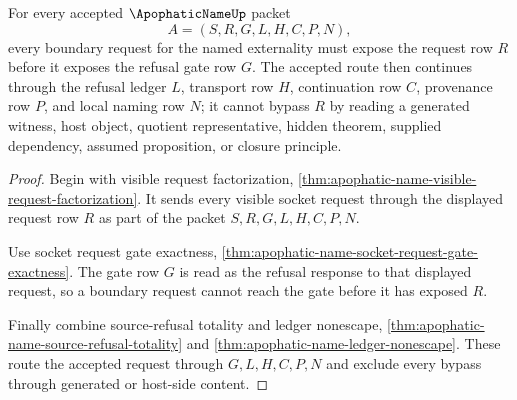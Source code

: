 \begin{theorem}
\label{thm:apophatic-name-boundary-request-totality}
For every accepted $\ApophaticNameUp$ packet
$$
A=(S,R,G,L,H,C,P,N),
$$
every boundary request for the named externality must expose the request row $R$ before it exposes the refusal gate row $G$. The accepted route then continues through the refusal ledger $L$, transport row $H$, continuation row $C$, provenance row $P$, and local naming row $N$; it cannot bypass $R$ by reading a generated witness, host object, quotient representative, hidden theorem, supplied dependency, assumed proposition, or closure principle.
\end{theorem}
\begin{proof}
Begin with visible request factorization, \autoref{thm:apophatic-name-visible-request-factorization}. It sends every visible socket request through the displayed request row $R$ as part of the packet $S,R,G,L,H,C,P,N$.

Use socket request gate exactness, \autoref{thm:apophatic-name-socket-request-gate-exactness}. The gate row $G$ is read as the refusal response to that displayed request, so a boundary request cannot reach the gate before it has exposed $R$.

Finally combine source-refusal totality and ledger nonescape, \autoref{thm:apophatic-name-source-refusal-totality} and \autoref{thm:apophatic-name-ledger-nonescape}. These route the accepted request through $G,L,H,C,P,N$ and exclude every bypass through generated or host-side content.
\end{proof}

